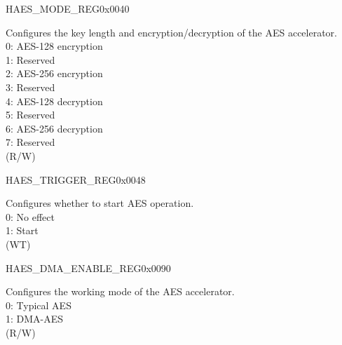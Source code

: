 \begin{register}{H}{AES\_MODE\_REG}{0x0040}\label{regdesc:AESMODEREG}
%
%
\regnewline%
\begin{regdesc}\begin{reglist}
\item [AES\_MODE] Configures the key length and encryption/decryption of the AES accelerator.\\
0: AES-128 encryption\\
1: Reserved\\
2: AES-256 encryption\\
3: Reserved\\
4: AES-128 decryption\\
5: Reserved\\
6: AES-256 decryption\\
7: Reserved\\
(R/W)
\end{reglist}\end{regdesc}
\end{register}

\begin{register}{H}{AES\_TRIGGER\_REG}{0x0048}\label{regdesc:AESTRIGGERREG}
%
%
\regnewline%
\begin{regdesc}\begin{reglist}
\label{fielddesc:AESTRIGGER}\item [AES\_TRIGGER] Configures whether to start AES operation. \\
0: No effect\\
1: Start\\ (WT)
\end{reglist}\end{regdesc}
\end{register}

\begin{register}{H}{AES\_DMA\_ENABLE\_REG}{0x0090}\label{regdesc:AESDMAENABLEREG}
%
%
\regnewline%
\begin{regdesc}\begin{reglist}
\label{fielddesc:AESDMAENABLE}\item [AES\_DMA\_ENABLE] Configures the working mode of the AES accelerator. \\
0: Typical AES\\
1: DMA-AES\\
(R/W) 
\end{reglist}\end{regdesc}
\end{register}



